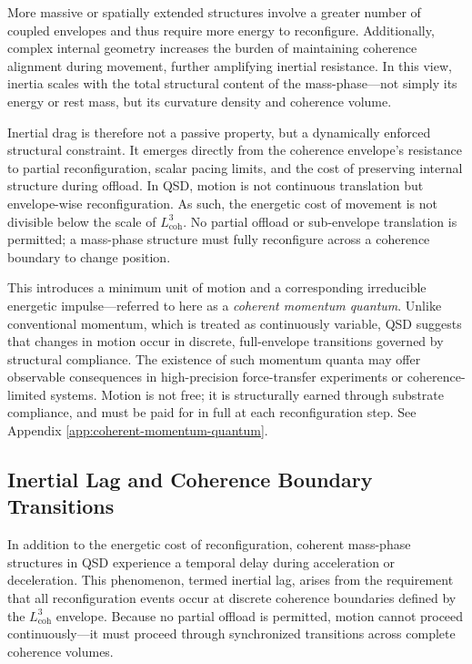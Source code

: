 \documentclass[entropy,article,submit,pdftex,moreauthors]{Definitions/mdpi}
\begin{document}
More massive or spatially extended structures involve a greater number of coupled envelopes and thus require more energy to reconfigure. Additionally, complex internal geometry increases the burden of maintaining coherence alignment during movement, further amplifying inertial resistance. In this view, inertia scales with the total structural content of the mass-phase—not simply its energy or rest mass, but its curvature density and coherence volume.

Inertial drag is therefore not a passive property, but a dynamically enforced structural constraint. It emerges directly from the coherence envelope’s resistance to partial reconfiguration, scalar pacing limits, and the cost of preserving internal structure during offload. In QSD, motion is not continuous translation but envelope-wise reconfiguration. As such, the energetic cost of movement is not divisible below the scale of \texorpdfstring{\( L_{\text{coh}}^3 \)}{Lcoh\^{}3}. No partial offload or sub-envelope translation is permitted; a mass-phase structure must fully reconfigure across a coherence boundary to change position.

This introduces a minimum unit of motion and a corresponding irreducible energetic impulse—referred to here as a \textit{coherent momentum quantum}. Unlike conventional momentum, which is treated as continuously variable, QSD suggests that changes in motion occur in discrete, full-envelope transitions governed by structural compliance. The existence of such momentum quanta may offer observable consequences in high-precision force-transfer experiments or coherence-limited systems. Motion is not free; it is structurally earned through substrate compliance, and must be paid for in full at each reconfiguration step.  See Appendix \ref{app:coherent-momentum-quantum}.

\subsection{Inertial Lag and Coherence Boundary Transitions}

In addition to the energetic cost of reconfiguration, coherent mass-phase structures in QSD experience a temporal delay during acceleration or deceleration. This phenomenon, termed inertial lag, arises from the requirement that all reconfiguration events occur at discrete coherence boundaries defined by the \texorpdfstring{\( L_{\text{coh}}^3 \)}{Lcoh\^{}3} envelope. Because no partial offload is permitted, motion cannot proceed continuously—it must proceed through synchronized transitions across complete coherence volumes.
\end{document}
